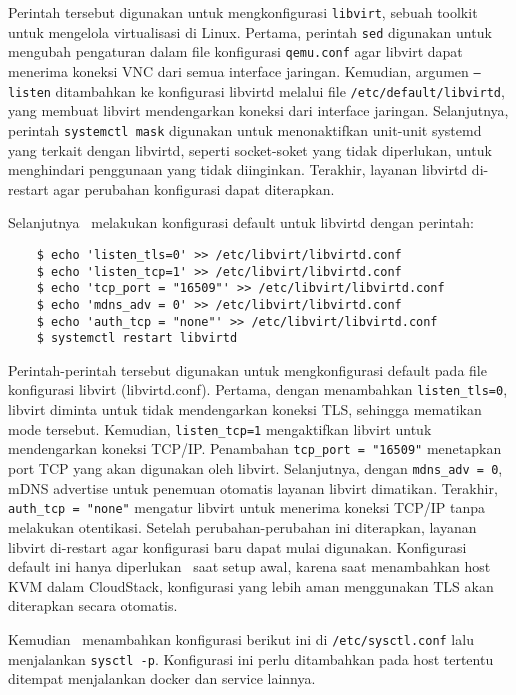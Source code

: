 Perintah tersebut digunakan untuk mengkonfigurasi \texttt{libvirt}, sebuah toolkit untuk mengelola virtualisasi di Linux. Pertama, perintah \texttt{sed} digunakan untuk mengubah pengaturan dalam file konfigurasi \texttt{qemu.conf} agar libvirt dapat menerima koneksi VNC dari semua interface jaringan. Kemudian, argumen \texttt{--listen} ditambahkan ke konfigurasi libvirtd melalui file \texttt{/etc/default/libvirtd}, yang membuat libvirt mendengarkan koneksi dari interface jaringan. Selanjutnya, perintah \texttt{systemctl mask} digunakan untuk menonaktifkan unit-unit systemd yang terkait dengan libvirtd, seperti socket-soket yang tidak diperlukan, untuk menghindari penggunaan yang tidak diinginkan. Terakhir, layanan libvirtd di-restart agar perubahan konfigurasi dapat diterapkan.

Selanjutnya \saya\ melakukan konfigurasi default untuk libvirtd dengan perintah:

\begin{listing}[H]
    \begin{verbatim}
    $ echo 'listen_tls=0' >> /etc/libvirt/libvirtd.conf
    $ echo 'listen_tcp=1' >> /etc/libvirt/libvirtd.conf
    $ echo 'tcp_port = "16509"' >> /etc/libvirt/libvirtd.conf
    $ echo 'mdns_adv = 0' >> /etc/libvirt/libvirtd.conf
    $ echo 'auth_tcp = "none"' >> /etc/libvirt/libvirtd.conf
    $ systemctl restart libvirtd
    \end{verbatim}
\end{listing}

Perintah-perintah tersebut digunakan untuk mengkonfigurasi default pada file konfigurasi libvirt (libvirtd.conf). Pertama, dengan menambahkan \texttt{listen\_tls=0}, libvirt diminta untuk tidak mendengarkan koneksi TLS, sehingga mematikan mode tersebut. Kemudian, \texttt{listen\_tcp=1} mengaktifkan libvirt untuk mendengarkan koneksi TCP/IP. Penambahan \texttt{tcp\_port = "16509"} menetapkan port TCP yang akan digunakan oleh libvirt. Selanjutnya, dengan \texttt{mdns\_adv = 0}, mDNS advertise untuk penemuan otomatis layanan libvirt dimatikan. Terakhir, \texttt{auth\_tcp = "none"} mengatur libvirt untuk menerima koneksi TCP/IP tanpa melakukan otentikasi. Setelah perubahan-perubahan ini diterapkan, layanan libvirt di-restart agar konfigurasi baru dapat mulai digunakan. Konfigurasi default ini hanya diperlukan \saya\ saat setup awal, karena saat menambahkan host KVM dalam CloudStack, konfigurasi yang lebih aman menggunakan TLS akan diterapkan secara otomatis.

Kemudian \saya\ menambahkan konfigurasi berikut ini di \texttt{/etc/sysctl.conf} lalu menjalankan \texttt{sysctl -p}. Konfigurasi ini perlu ditambahkan pada host tertentu ditempat menjalankan docker dan service lainnya.


